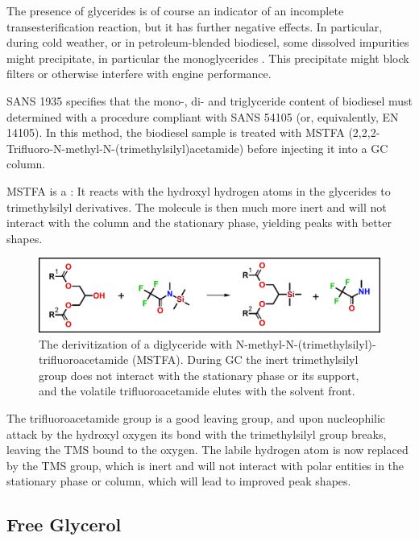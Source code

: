 The presence of glycerides is of course an indicator of an incomplete
transesterification reaction, but it has further negative effects. In
particular, during cold weather, or in petroleum-blended biodiesel, some
dissolved impurities might precipitate, in particular the monoglycerides
\autocite{Dunn2009,Plata2015}. This precipitate might block filters or otherwise
interfere with engine performance.

SANS 1935 specifies that the mono-, di- and triglyceride content of biodiesel
must determined with a procedure compliant with SANS 54105 (or, equivalently, EN
14105). In this method, the biodiesel sample is treated with MSTFA
(2,2,2-Trifluoro-N-methyl-N-(trimethylsilyl)acetamide) before injecting it into
a GC column.

MSTFA is a : It reacts with the hydroxyl
hydrogen atoms in the glycerides to trimethylsilyl derivatives. The molecule is
then much more inert and will not interact with the column and the stationary
phase, yielding peaks with better shapes. 

\begin{figure}
\centering
\includegraphics[width=\textwidth]{Figures/Derivitization.pdf}
\decoRule

\caption[Derivitization]{The derivitization of a diglyceride with
N-methyl-N-(trimethylsilyl)-trifluoroacetamide (MSTFA). During GC the inert
trimethylsilyl group does not interact with the stationary phase or its support,
and the volatile trifluoroacetamide elutes with the solvent front.}

\label{fig:MSTFA}
\end{figure}

The trifluoroacetamide group is a good leaving group, and upon nucleophilic
attack by the hydroxyl oxygen its bond with the trimethylsilyl group breaks,
leaving the TMS bound to the oxygen. The labile hydrogen atom is now replaced by
the TMS group, which is inert and will not interact with polar entities in the
stationary phase or column, which will lead to improved peak shapes. 

\subsection{Free Glycerol}

